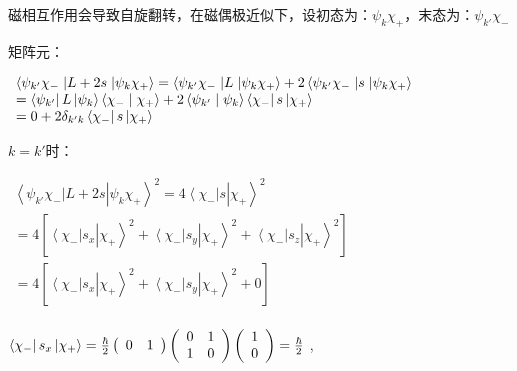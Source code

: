 磁相互作用会导致自旋翻转，在磁偶极近似下，设初态为：$\psi _k \chi _ +  $，末态为：$\psi _{k'} \chi _ -  $


矩阵元：

$\begin{array}{l}
 \left\langle {\psi _{k'} \chi _ -  } \right.\left| {L + 2s} \right.\left| {\psi _k \chi _ +  } \right\rangle  = \left\langle {\psi _{k'} \chi _ -  } \right.\left| L \right.\left| {\psi _k \chi _ +  } \right\rangle  + 2\left\langle {\psi _{k'} \chi _ -  } \right.\left| s \right.\left| {\psi _k \chi _ +  } \right\rangle  \\
  = \left\langle {\psi _{k'} } \right|L\left| {\psi _k } \right\rangle \left\langle {{\chi _ -  }}
 \mathrel{\left | {\vphantom {{\chi _ -  } {\chi _ +  }}}
 \right. \kern-\nulldelimiterspace}
 {{\chi _ +  }} \right\rangle  + 2\left\langle {{\psi _{k'} }}
 \mathrel{\left | {\vphantom {{\psi _{k'} } {\psi _k }}}
 \right. \kern-\nulldelimiterspace}
 {{\psi _k }} \right\rangle \left\langle {\chi _ -  } \right|s\left| {\chi _ +  } \right\rangle \\
 = 0 + 2\delta _{k'k} \left\langle {\chi _ -  } \right|s\left| {\chi _ +  } \right\rangle  \\
 \end{array}$

$k = k'$时：

$\begin{array}{l}
 \left\langle {\psi _{k'} \chi _ -  } \right.\left| {L + 2s} \right.\left| {\psi _k \chi _ +  } \right\rangle ^2  = 4\left\langle {\chi _ -  } \right|s\left| {\chi _ +  } \right\rangle ^2  \\
 = 4\left[ {\left\langle {\chi _ -  } \right|s_x \left| {\chi _ +  } \right\rangle ^2  + \left\langle {\chi _ -  } \right|s_y \left| {\chi _ +  } \right\rangle ^2  + \left\langle {\chi _ -  } \right|s_z \left| {\chi _ +  } \right\rangle ^2 } \right] \\
  = 4\left[ {\left\langle {\chi _ -  } \right|s_x \left| {\chi _ +  } \right\rangle ^2  + \left\langle {\chi _ -  } \right|s_y \left| {\chi _ +  } \right\rangle ^2  + 0} \right] \\
 \end{array}$

$\left\langle {\chi _ -  } \right|s_x \left| {\chi _ +  } \right\rangle  = \frac{\hbar }{2}\left( {\begin{array}{*{20}c}
   0 & 1  \\
\end{array}} \right)\left( {\begin{array}{*{20}c}
   0 & 1  \\
   1 & 0  \\
\end{array}} \right)\left( {\begin{array}{*{20}c}
   1  \\
   0  \\
\end{array}} \right) = \frac{\hbar }{2}$
,


